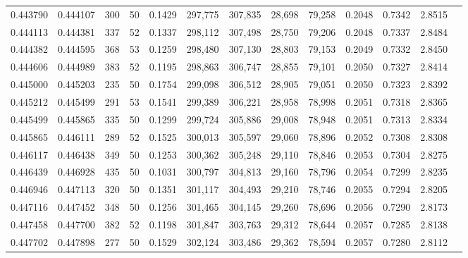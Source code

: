 \begin{tabular}{rrrrrrrrrrrrr}
0.443790 & 0.444107 &   300 &  50 &                                     0.1429 & 297,775 & 307,835 &  28,698 &  79,258 & 0.2048 & 0.7342 & 2.8515 \\
0.444113 & 0.444381 &   337 &  52 &                                     0.1337 & 298,112 & 307,498 &  28,750 &  79,206 & 0.2048 & 0.7337 & 2.8484 \\
0.444382 & 0.444595 &   368 &  53 &                                     0.1259 & 298,480 & 307,130 &  28,803 &  79,153 & 0.2049 & 0.7332 & 2.8450 \\
0.444606 & 0.444989 &   383 &  52 &                                     0.1195 & 298,863 & 306,747 &  28,855 &  79,101 & 0.2050 & 0.7327 & 2.8414 \\
0.445000 & 0.445203 &   235 &  50 &                                     0.1754 & 299,098 & 306,512 &  28,905 &  79,051 & 0.2050 & 0.7323 & 2.8392 \\
0.445212 & 0.445499 &   291 &  53 &                                     0.1541 & 299,389 & 306,221 &  28,958 &  78,998 & 0.2051 & 0.7318 & 2.8365 \\
0.445499 & 0.445865 &   335 &  50 &                                     0.1299 & 299,724 & 305,886 &  29,008 &  78,948 & 0.2051 & 0.7313 & 2.8334 \\
0.445865 & 0.446111 &   289 &  52 &                                     0.1525 & 300,013 & 305,597 &  29,060 &  78,896 & 0.2052 & 0.7308 & 2.8308 \\
0.446117 & 0.446438 &   349 &  50 &                                     0.1253 & 300,362 & 305,248 &  29,110 &  78,846 & 0.2053 & 0.7304 & 2.8275 \\
0.446439 & 0.446928 &   435 &  50 &                                     0.1031 & 300,797 & 304,813 &  29,160 &  78,796 & 0.2054 & 0.7299 & 2.8235 \\
0.446946 & 0.447113 &   320 &  50 &                                     0.1351 & 301,117 & 304,493 &  29,210 &  78,746 & 0.2055 & 0.7294 & 2.8205 \\
0.447116 & 0.447452 &   348 &  50 &                                     0.1256 & 301,465 & 304,145 &  29,260 &  78,696 & 0.2056 & 0.7290 & 2.8173 \\
0.447458 & 0.447700 &   382 &  52 &                                     0.1198 & 301,847 & 303,763 &  29,312 &  78,644 & 0.2057 & 0.7285 & 2.8138 \\
0.447702 & 0.447898 &   277 &  50 &                                     0.1529 & 302,124 & 303,486 &  29,362 &  78,594 & 0.2057 & 0.7280 & 2.8112 \\

\end{tabular}
